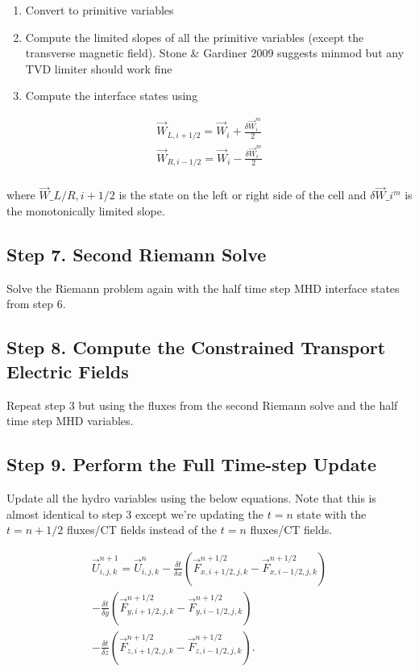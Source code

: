 \begin{enumerate}
    \item Convert to primitive variables
    \item Compute the limited slopes of all the primitive variables (except the transverse magnetic field). Stone \& Gardiner 2009 suggests minmod but any TVD limiter should work fine
    \item Compute the interface states using
\end{enumerate}

    $$
        \begin{aligned}
            \vec{W}_{L, i+1/2} = \vec{W}_{i} + \frac{\delta \vec{W}_{i}^m}{2} \\
            \vec{W}_{R, i-1/2} = \vec{W}_{i} - \frac{\delta \vec{W}_{i}^m}{2} \\
        \end{aligned}
    $$

    where $ \vec{W}\_{L/R, i+1/2} $ is the state on the left or right side
    of the cell and $ \delta \vec{W}\_{i}^m $ is the monotonically limited
    slope.

\subsection{Step 7. Second Riemann Solve}
\label{vlct:2nd-riemann-solve}

Solve the Riemann problem again with the half time step MHD interface states from step 6.

\subsection{Step 8. Compute the Constrained Transport Electric Fields}
\label{vlct:2nd-emf}

Repeat step 3 but using the fluxes from the second Riemann solve and the half time step MHD variables.

\subsection{Step 9. Perform the Full Time-step Update}
\label{vlct:full-dt-update}

Update all the hydro variables using the below equations. Note that this is almost identical to step 3 except we're updating the $ t = n $ state with the $ t=n+1/2 $ fluxes/CT fields instead of the $ t=n $ fluxes/CT fields.

$$
    \begin{aligned}
        \vec{U}^{n+1}_{i,j,k} = \vec{U}^{n}_{i,j,k}
        - \frac{\delta t}{\delta x} \left( \vec{F}^{n+1/2}_{x,i+1/2,j,k} - \vec{F}^{n+1/2}_{x,i-1/2,j,k} \right) \\
        - \frac{\delta t}{\delta y} \left( \vec{F}^{n+1/2}_{y,i+1/2,j,k} - \vec{F}^{n+1/2}_{y,i-1/2,j,k} \right) \\
        - \frac{\delta t}{\delta z} \left( \vec{F}^{n+1/2}_{z,i+1/2,j,k} - \vec{F}^{n+1/2}_{z,i-1/2,j,k} \right).
    \end{aligned}
$$

